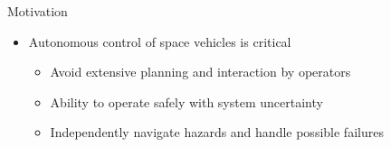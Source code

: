 
\begin{frame}[t]{Motivation} %
\begin{itemize}
    \item Autonomous control of space vehicles is critical
    \begin{itemize}
        \item Avoid extensive planning and interaction by operators
        \item Ability to operate safely with system uncertainty 
        \item Independently navigate hazards and handle possible failures
    \end{itemize}
\end{itemize}
\end{frame}   %